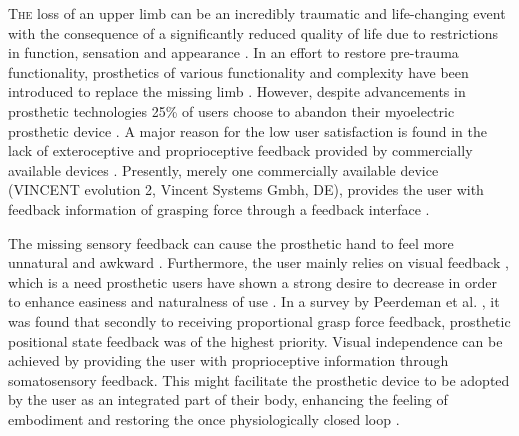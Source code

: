 

\lettrine{T}{he} loss of an upper limb can be an incredibly traumatic and life-changing event with the consequence of a significantly reduced quality of life due to restrictions in function, sensation and appearance \cite{Schofield2014,Ostlie2011}. 
In an effort to restore pre-trauma functionality, prosthetics of various functionality and complexity have been introduced to replace the missing limb \cite{Geethanjali2016}. However, despite advancements in prosthetic technologies 25\% of users choose to abandon their myoelectric prosthetic device \cite{Biddiss2007a}. A major reason for the low user satisfaction is found in the lack of exteroceptive and proprioceptive feedback provided by commercially available devices \cite{Schofield2014,Peerdeman2011}. Presently, merely one commercially available device (VINCENT evolution 2, Vincent Systems Gmbh, DE), provides the user with feedback information of grasping force through a feedback interface \cite{Systems2005}. 
    
%
The missing sensory feedback can cause the prosthetic hand to feel more unnatural and awkward \cite{Pamungkas2015}. Furthermore, the user mainly relies on visual feedback \cite{Pamungkas2015,Stephens-Fripp2018}, which is a need prosthetic users have shown a strong desire to decrease in order to enhance easiness and naturalness of use \cite{Atkins1996}.
In a survey by Peerdeman et al. \cite{Peerdeman2011}, it was found that secondly to receiving proportional grasp force feedback, prosthetic positional state feedback was of the highest priority. Visual independence can be achieved by providing the user with proprioceptive information through somatosensory feedback. This might facilitate the prosthetic device to be adopted by the user as an integrated part of their body, enhancing the feeling of embodiment and restoring the once physiologically closed loop \cite{Stephens-Fripp2018,Xu2016,Strbac2016,Geng2012}. 

